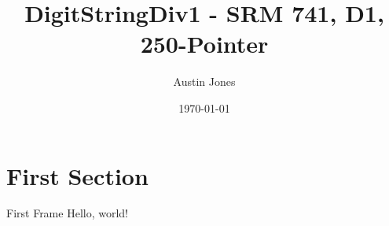 \documentclass{beamer}
\author{Austin Jones}
\title{DigitStringDiv1 \-- SRM 741, D1, 250-Pointer}
\date{\today}
\institute{University of Tennessee \-- Knoxville}
\begin{document}
\maketitle

\section{First Section}

\begin{frame}{First Frame}
  Hello, world!
\end{frame}
\end{document}
